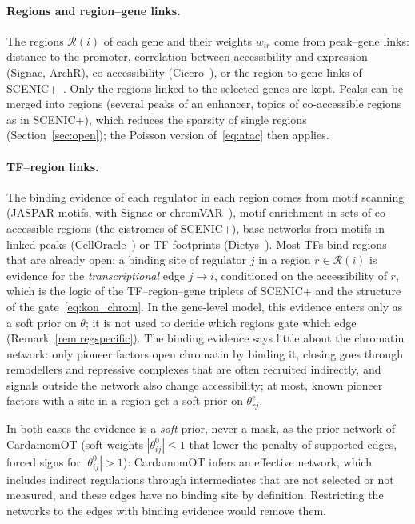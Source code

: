 \documentclass[a4paper, 11pt]{article}
\newcommand{\thc}{\theta^{\mathrm{c}}}
\newcommand{\Rg}{\mathcal{R}}
\theoremstyle{plain}
\theoremstyle{remark}
\begin{document}
\paragraph{Regions and region--gene links.} The regions $\Rg(i)$ of each gene and their weights $w_{ir}$ come from peak--gene links: distance to the promoter, correlation between accessibility and expression (Signac, ArchR), co-accessibility (Cicero~\cite{pliner2018cicero}), or the region-to-gene links of SCENIC+~\cite{bravo2023scenicplus}. Only the regions linked to the selected genes are kept. Peaks can be merged into regions (several peaks of an enhancer, topics of co-accessible regions as in SCENIC+), which reduces the sparsity of single regions (Section~\ref{sec:open}); the Poisson version of~\eqref{eq:atac} then applies.

\paragraph{TF--region links.} The binding evidence of each regulator in each region comes from motif scanning (JASPAR motifs, with Signac or chromVAR~\cite{schep2017chromvar}), motif enrichment in sets of co-accessible regions (the cistromes of SCENIC+), base networks from motifs in linked peaks (CellOracle~\cite{kamimoto2023celloracle}) or TF footprints (Dictys~\cite{wang2023dictys}). Most TFs bind regions that are already open: a binding site of regulator $j$ in a region $r \in \Rg(i)$ is evidence for the \emph{transcriptional} edge $j \to i$, conditioned on the accessibility of $r$, which is the logic of the TF--region--gene triplets of SCENIC+ and the structure of the gate~\eqref{eq:kon_chrom}. In the gene-level model, this evidence enters only as a soft prior on $\theta$; it is not used to decide which regions gate which edge (Remark~\ref{rem:regspecific}). The binding evidence says little about the chromatin network: only pioneer factors open chromatin by binding it, closing goes through remodellers and repressive complexes that are often recruited indirectly, and signals outside the network also change accessibility; at most, known pioneer factors with a site in a region get a soft prior on $\thc_{rj}$.

In both cases the evidence is a \emph{soft} prior, never a mask, as the prior network of CardamomOT (soft weights $|\theta^0_{ij}| \leq 1$ that lower the penalty of supported edges, forced signs for $|\theta^0_{ij}| > 1$): CardamomOT infers an effective network, which includes indirect regulations through intermediates that are not selected or not measured, and these edges have no binding site by definition. Restricting the networks to the edges with binding evidence would remove them.
\end{document}
